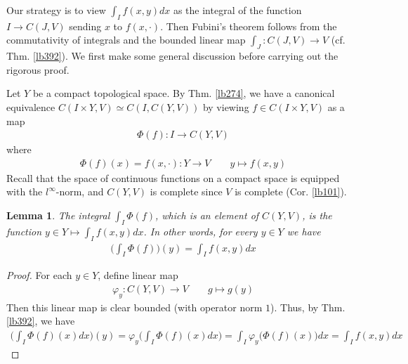 \documentclass[12pt,b5paper,notitlepage]{article}
\theoremstyle{definition}
\theoremstyle{plain}
\newtheorem{lm}[df]{Lemma}
\numberwithin{equation}{section}
\begin{document}
Our strategy is to view $\int_I f(x,y)dx$ as the integral of the function $I\rightarrow C(J,V)$ sending $x$ to $f(x,\cdot)$. Then Fubini's theorem follows from the commutativity of integrals and the bounded linear map $\int_J:C(J,V)\rightarrow V$ (cf. Thm. \ref{lb392}). We first make some general discussion before carrying out the rigorous proof.


Let $Y$ be a compact topological space. By Thm. \ref{lb274}, we have a canonical equivalence $C(I\times Y,V)\simeq C(I,C(Y,V))$ by viewing $f\in C(I\times Y,V)$ as a map
\begin{align*}
\Phi(f):I\rightarrow C(Y,V)
\end{align*}
where
\begin{align*}
\Phi(f)(x)=f(x,\cdot):Y\rightarrow V\qquad y\mapsto f(x,y)
\end{align*}
Recall that the space of continuous functions on a compact space is equipped with the $l^\infty$-norm, and $C(Y,V)$ is complete since $V$ is complete (Cor. \ref{lb101}).

\begin{lm}\label{lb400}
The integral  $\int_I\Phi(f)$, which is an element of $C(Y,V)$, is the function $y\in Y\mapsto \int_I f(x,y)dx$. In other words, for every $y\in Y$ we have
\begin{align}
\Big(\int_I\Phi(f)\Big)(y)=\int_I f(x,y)dx
\end{align}
\end{lm}


\begin{proof}
For each $y\in Y$, define linear map
\begin{align*}
\varphi_y:C(Y,V)\rightarrow V\qquad g\mapsto g(y)
\end{align*}
Then this linear map is clear bounded (with operator norm $1$). Thus, by Thm. \ref{lb392}, we have
\begin{align*}
\Big(\int_I\Phi(f)(x)dx\Big)(y)=\varphi_y\Big(\int_I\Phi(f)(x)dx\Big)=\int_I\varphi_y\big(\Phi(f)(x)\big)dx=\int_I f(x,y)dx
\end{align*}
\end{proof}
\end{document}
